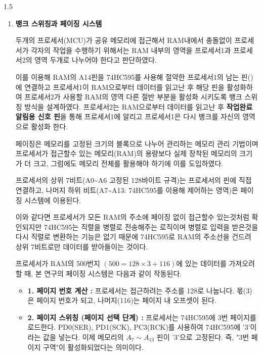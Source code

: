 \documentclass[a4paper, 12pt]{article}
\begin{document}
\begin{spacing}{1.5}
\begin{enumerate}
\font=0.7em
\item \textbf{뱅크 스위칭과 페이징 시스템} 

두개의 프로세서(MCU)가 공유 메모리에 접근해서 RAM내에서 충돌없이 프로세서가 각자의 작업을 수행하기 위해서는 RAM 내부의 영역을 프로세서1과 프로세서2의 영역 두개로 나누어야 한다고 판단하였다.

이를 이용해 RAM의 A14핀을 74HC595를 사용해 절약한 프로세서1의 남는 핀()에 연결하고 프로세서1이 RAM으로부터 데이터를 읽고난 후 해당 핀을 활성화하여 프로세서2가 사용할 RAM의 영역 다른 절반 부분을 활성화 시키도록 뱅크 스위칭 방식을 설계하였다. 프로세서2는 RAM으로부터 데이터를 읽고난 후 \textbf{작업완료 알림용  신호 핀}을 통해 프로세서1에 알리고 프로세서1은 다시 뱅크를 자신의 영역으로 활성화 한다. \par

페이징은 메모리를 고정된 크기의 블록으로 나누어 관리하는 메모리 관리 기법이며 프로세서가 접근할수 있는 메모리(RAM)의 용량보다 실제 장착된 메모리의 크기가 더 크고, 그럼에도 메모리 전체를 활용해야 하기에 이를 도입하였다.

프로세서의 상위 7비트(A0\textasciitilde A6 고정된 128바이트 규격)는 프로세서의 핀에 직접 연결하고, 나머지 하위 비트(A7\textasciitilde A13: 74HC595를 이용해 제어하는 영역)은 페이징 시스템에 이용된다.

이와 같다면 프로세서가 모든 RAM의 주소에 페이징 없이 접근할수 있는것처럼 확인되지만
74HC595는 직렬을 병렬로 전송해주는 로직이며 병렬로 입력을 받은것을 다시 직렬로 변환하는 기능은 없기 때문에 74HC595로 RAM의 주소선을 건드려 상위 7비트로만 데이터를 받아들이는 것이다.

프로세서가 RAM의 500번지 \((500 = 128 \times 3 + 116)\)에 있는 데이터를 가져오려 할 때, 
본 연구의 페이징 시스템은 다음과 같이 작동된다.

\begin{itemize}
    \item \textbf{1. 페이지 번호 계산 :}
    프로세서는 접근하려는 주소를 128로 나눕니다. 몫(3)은 페이지 번호가 되고, 나머지(116)는 페이지 내 오프셋이 된다.
    
    \item \textbf{2. 페이지 스위칭 (페이지 선택 단계) :}
    프로세서는 74HC595에 3번 페이지를 로드한다. PD0(SER), PD1(SCK), PC3(RCK)를 사용하여 74HC595에 '3'이라는 값을 넣는다. 
    이제 메모리의 $A_7 \sim A_{13}$ 핀이 '3'으로 고정된다. 즉, "3번 페이지 구역"이 활성화되었다는 의미이다.


\end{itemize}
\end{enumerate}
\end{spacing}
\end{document}
